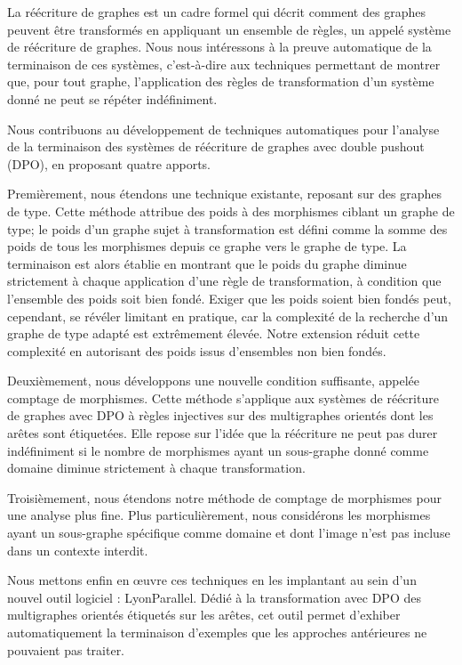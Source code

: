 La réécriture de graphes est un cadre formel qui décrit comment des graphes peuvent être transformés en appliquant un ensemble de règles, un appelé système de réécriture de graphes. Nous nous intéressons à la preuve automatique de la terminaison de ces systèmes, c'est-à-dire aux techniques permettant de montrer que, pour tout graphe, l'application des règles de transformation d'un système donné ne peut se répéter indéfiniment.

Nous contribuons au développement de techniques automatiques pour l'analyse de la terminaison des systèmes de réécriture de graphes avec double pushout (DPO), en proposant quatre apports.

Premièrement, nous étendons une technique existante,
reposant sur des graphes de type. Cette méthode attribue des poids à des morphismes ciblant un graphe de type; le poids d'un graphe sujet à transformation est défini comme la somme des poids de tous les morphismes depuis ce graphe vers le graphe de type. La terminaison est alors établie en montrant que le poids du graphe diminue strictement à chaque application d'une règle de transformation, à condition que l'ensemble des poids soit bien fondé. Exiger que les poids soient bien fondés peut, cependant, se révéler limitant en pratique, car la complexité de la recherche d'un graphe de type adapté est extrêmement élevée. Notre extension réduit cette complexité en autorisant des poids issus d'ensembles non bien fondés. 

Deuxièmement, nous développons une nouvelle condition suffisante, appelée comptage de morphismes. Cette méthode s'applique aux systèmes de réécriture de graphes avec DPO à règles injectives sur des multigraphes orientés dont les arêtes sont étiquetées. Elle repose sur l'idée que la réécriture ne peut pas durer indéfiniment si le nombre de morphismes ayant un sous-graphe donné comme domaine diminue strictement à chaque transformation.

Troisièmement, nous étendons notre méthode de comptage de morphismes pour une analyse plus fine. Plus particulièrement, nous considérons les morphismes ayant un sous-graphe spécifique comme domaine et dont l'image n'est pas incluse dans un contexte interdit.

Nous mettons enfin en œuvre ces techniques en les implantant au sein d'un nouvel outil logiciel : LyonParallel. Dédié à la transformation avec DPO des multigraphes orientés étiquetés sur les arêtes, cet outil permet d'exhiber automatiquement la terminaison d'exemples que les approches antérieures ne pouvaient pas traiter.
